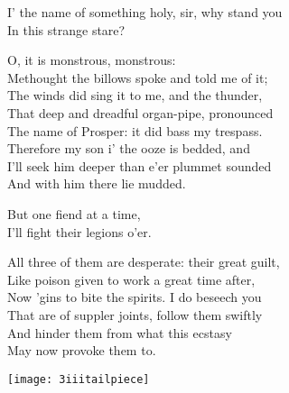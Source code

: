 
\begin{verse_speech}[Gonzalo] 
I' the name of something holy, sir, why stand you\\
In this strange stare?
\end{verse_speech}

\begin{verse_speech}[Alonso] 
O, it is monstrous, monstrous:\\
Methought the billows spoke and told me of it;\\
The winds did sing it to me, and the thunder,\\
That deep and dreadful organ-pipe, pronounced\\
The name of Prosper: it did bass my trespass.\\
Therefore my son i' the ooze is bedded, and\\
I'll seek him deeper than e'er plummet sounded\\
And with him there lie mudded.
\end{verse_speech}

\exit{}

\begin{verse_speech}[Sebastian] 
But one fiend at a time,\\
I'll fight their legions o'er.
\end{verse_speech}



\begin{verse_speech}[Gonzalo] 
All three of them are desperate: their great guilt,\\
Like poison given to work a great time after,\\
Now 'gins to bite the spirits. I do beseech you\\
That are of suppler joints, follow them swiftly\\
And hinder them from what this ecstasy\\
May now provoke them to.
\end{verse_speech}


\exeunt{}

\begin{center}
\texttt{[image: 3iiitailpiece]}
\end{center}